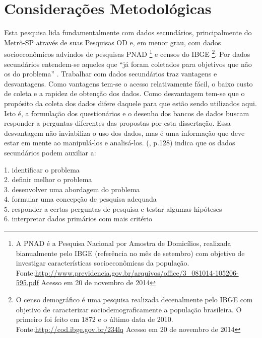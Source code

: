 \chapter{Considerações Metodológicas}\label{chap:metodo}


Esta pesquisa lida fundamentalmente com dados secundários, principalmente do Metrô-SP através de suas Pesquisas OD e, em menor grau, com dados socioeconômicos advindos de pesquisas PNAD%
\footnote{A PNAD é a Pesquisa Nacional por Amostra de Domicílios, realizada bianualmente pelo IBGE (referência no mês de setembro) com objetivo de investigar características socioeconômicas da população. Fonte:\url{http://www.previdencia.gov.br/arquivos/office/3_081014-105206-595.pdf} Acesso em 20 de novembro de 2014} e censos do IBGE%
\footnote{O censo demográfico é uma pesquisa realizada decenalmente pelo IBGE com objetivo de caracterizar sociodemograficamente a população brasileira. O primeiro foi feito em 1872 e o último data de 2010. Fonte:\url{http://cod.ibge.gov.br/234lq} Acesso em 20 de novembro de 2014}.
Por dados secundários entendem-se aqueles que ``já foram coletados para objetivos que não os do problema'' \cite[p.127]{MALHORTA2001}. Trabalhar com dados secundários traz vantagens e desvantagens. Como vantagens tem-se o acesso relativamente fácil, o baixo custo de coleta e a rapidez de obtenção dos dados. Como desvantagem tem-se que o propósito da coleta dos dados difere daquele para que estão sendo utilizados aqui. Isto é, a formulação dos questionários e o desenho dos bancos de dados buscam responder a perguntas diferentes das propostas por esta dissertação.
Essa desvantagem não inviabiliza o uso dos dados, mas é uma informação que deve estar em mente ao manipulá-los e analisá-los.  (\citeyear{MALHORTA2001}, p.128) indica que os dados secundários podem auxiliar a:

\begin{citacao}
	1. identificar o problema\\
	2. definir melhor o problema\\
	3. desenvolver uma abordagem do problema\\
	4. formular uma concepção de pesquisa adequada\\
	5. responder a certas perguntas de pesquisa e testar algumas hipóteses\\
	6. interpretar dados primários com mais critério
\end{citacao}

